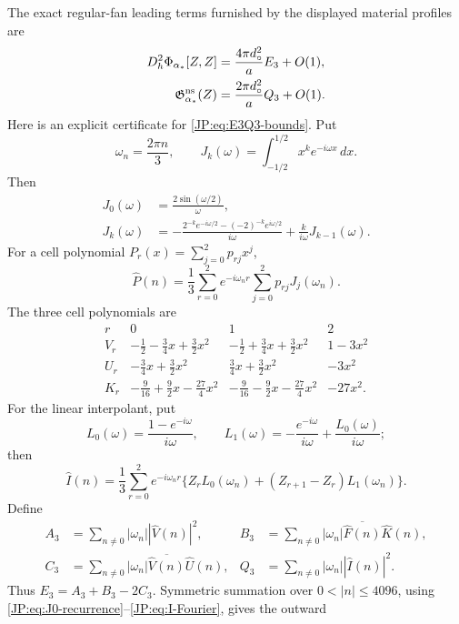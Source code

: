 \iffalse
The exact regular-fan leading terms furnished by the displayed material
profiles are
\begin{align*}
 D_h^2\Phi_{\alpha_*}[Z,Z]
 &=\frac{4\pi d_\circ^2}{a}E_3+O(1),\\
 \mathfrak G_{\alpha_*}^{\rm ns}(Z)
 &=\frac{2\pi d_\circ^2}{a}Q_3+O(1).
\end{align*}
Here is an explicit certificate for \eqref{JP:eq:E3Q3-bounds}.  Put
\[
 \omega_n=\frac{2\pi n}{3},\qquad
 J_k(\omega)=\int_{-1/2}^{1/2}x^ke^{-i\omega x}\,dx.
\]
Then
\begin{align}
 J_0(\omega)&=\frac{2\sin(\omega/2)}{\omega},\label{JP:eq:J0-recurrence}\\
 J_k(\omega)&=
 -\frac{2^{-k}e^{-i\omega/2}-(-2)^{-k}e^{i\omega/2}}{i\omega}
 +\frac{k}{i\omega}J_{k-1}(\omega).\label{JP:eq:Jk-recurrence}
\end{align}
For a cell polynomial $P_r(x)=\sum_{j=0}^2p_{rj}x^j$,
\begin{equation}\label{JP:eq:poly-Fourier}
 \widehat P(n)=\frac13\sum_{r=0}^2e^{-i\omega_nr}
 \sum_{j=0}^2p_{rj}J_j(\omega_n).
\end{equation}
The three cell polynomials are
\[
\begin{array}{c|ccc}
r&0&1&2\\ \hline
V_r&-\frac12-\frac34x+\frac32x^2&
 -\frac12+\frac34x+\frac32x^2&1-3x^2\\
U_r&-\frac34x+\frac32x^2&
 \frac34x+\frac32x^2&-3x^2\\
K_r&-\frac9{16}+\frac92x-\frac{27}{4}x^2&
 -\frac9{16}-\frac92x-\frac{27}{4}x^2&-27x^2.
\end{array}
\]
For the linear interpolant, put
\[
 L_0(\omega)=\frac{1-e^{-i\omega}}{i\omega},\qquad
 L_1(\omega)=-\frac{e^{-i\omega}}{i\omega}
              +\frac{L_0(\omega)}{i\omega};
\]
then
\begin{equation}\label{JP:eq:I-Fourier}
 \widehat I(n)=\frac13\sum_{r=0}^2e^{-i\omega_nr}
 \{Z_rL_0(\omega_n)+(Z_{r+1}-Z_r)L_1(\omega_n)\}.
\end{equation}
Define
\[
\begin{aligned}
 A_3&=\sum_{n\ne0}|\omega_n||\widehat V(n)|^2,&
 B_3&=\sum_{n\ne0}|\omega_n|
       \overline{\widehat F(n)}\widehat K(n),\\
 C_3&=\sum_{n\ne0}|\omega_n|
       \overline{\widehat V(n)}\widehat U(n),&
 Q_3&=\sum_{n\ne0}|\omega_n||\widehat I(n)|^2.
\end{aligned}
\]
Thus $E_3=A_3+B_3-2C_3$.  Symmetric summation over
$0<|n|\le4096$, using
\eqref{JP:eq:J0-recurrence}--\eqref{JP:eq:I-Fourier}, gives the outward
